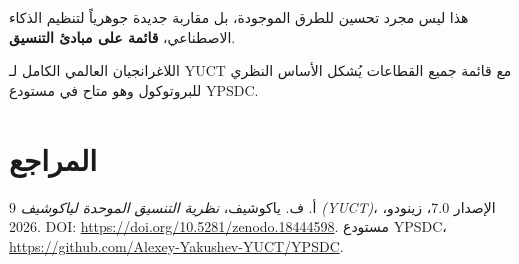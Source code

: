 \documentclass[11pt,a4paper]{article}
\begin{document}
	هذا ليس مجرد تحسين للطرق الموجودة، بل مقاربة جديدة جوهرياً لتنظيم الذكاء الاصطناعي، \textbf{قائمة على مبادئ التنسيق}.
	
	اللاغرانجيان العالمي الكامل لـ YUCT مع قائمة جميع القطاعات يُشكل الأساس النظري للبروتوكول وهو متاح في مستودع YPSDC.
	
	\section*{المراجع}
	\begin{thebibliography}{9}
		أ. ف. ياكوشيف، \emph{نظرية التنسيق الموحدة لياكوشيف (YUCT)}، الإصدار 7.0، زينودو، 2026. DOI: \url{https://doi.org/10.5281/zenodo.18444598}.
		مستودع YPSDC، \url{https://github.com/Alexey-Yakushev-YUCT/YPSDC}.
	\end{thebibliography}
	
\end{document}
